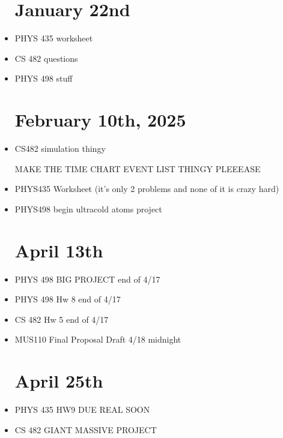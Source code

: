 \documentclass{report}
\begin{document}
\begin{itemize}
\chapter{January 22nd}
\item
PHYS 435 worksheet 
\item 
CS 482 questions 
\item 
PHYS 498 stuff 

\chapter{February 10th, 2025}
\item 
CS482 simulation thingy 

MAKE THE TIME CHART EVENT LIST THINGY PLEEEASE 
\item 
PHYS435 Worksheet (it's only 2 problems and none 
of it is crazy hard)
\item 
PHYS498 begin ultracold atoms project

\chapter{April 13th}
\item 
PHYS 498 BIG PROJECT  end of 4/17
\item 
PHYS 498 Hw 8 end of 4/17
\item 
CS 482 Hw 5 end of 4/17
\item 
MUS110 Final Proposal Draft 4/18 midnight 

\chapter{April 25th}
\item 
PHYS 435 HW9 DUE REAL SOON 
\item 
CS 482 GIANT MASSIVE PROJECT 
























\end{itemize}
\end{document}
